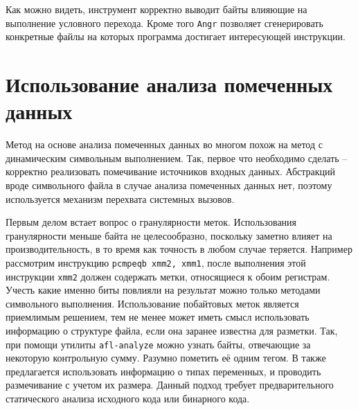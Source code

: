 Как можно видеть, инструмент корректно выводит байты влияющие на выполнение условного перехода. Кроме того \texttt{Angr} позволяет сгенерировать конкретные файлы на которых программа достигает интересующей инструкции.







\section{Использование анализа помеченных данных}
\label{taintmethod}

Метод на основе анализа помеченных данных во многом похож на метод с динамическим символьным выполнением. Так, первое что необходимо сделать -- корректно реализовать помечивание источников входных данных. Абстракций вроде символьного файла в случае анализа помеченных данных нет, поэтому используется механизм перехвата системных вызовов.

Первым делом встает вопрос о гранулярности меток. Использования гранулярности меньше байта не целесообразно, поскольку заметно влияет на производительность, в то время как точность в любом случае теряется. Например рассмотрим инструкцию \texttt{pcmpeqb xmm2, xmm1}, после выполнения этой инструкции \texttt{xmm2} должен содержать метки, относящиеся к обоим регистрам. Учесть какие именно биты повлияли на результат можно только методами символьного выполнения.
Использование побайтовых меток является приемлимым решением, тем не менее может иметь смысл использовать информацию о структуре файла, если она заранее известна для разметки. Так, при помощи утилиты \texttt{afl-analyze} можно узнать байты, отвечающие за некоторую контрольную сумму. Разумно пометить её одним тегом. В \cite{Angora} также предлагается использовать информацию о типах переменных, и проводить размечивание с учетом их размера. Данный подход требует предварительного статического анализа исходного кода или бинарного кода.

